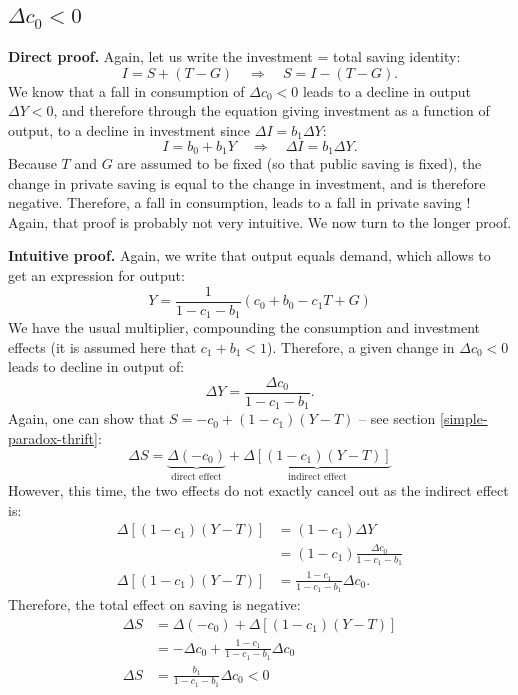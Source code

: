 \documentclass[]{book}
\theoremstyle{definition}
\theoremstyle{definition}
\theoremstyle{definition}
\theoremstyle{remark}
\begin{document}
\subsection{\texorpdfstring{\(\Delta c_{0}<0\)}{\textbackslash{}Delta c\_\{0\}\textless{}0}}\label{delta-c_00-1}

\textbf{Direct proof.} Again, let us write the investment = total saving
identity:
\[I=S+\left(T-G\right)\quad\Rightarrow\quad S=I-\left(T-G\right).\] We
know that a fall in consumption of \(\Delta c_{0}<0\) leads to a decline
in output \(\Delta Y<0\), and therefore through the equation giving
investment as a function of output, to a decline in investment since
\(\Delta I=b_{1}\Delta Y\):
\[I=b_{0}+b_{1}Y\quad\Rightarrow\quad\Delta I=b_{1}\Delta Y.\] Because
\(T\) and \(G\) are assumed to be fixed (so that public saving is
fixed), the change in private saving is equal to the change in
investment, and is therefore negative. Therefore, a fall in consumption,
leads to a fall in private saving ! Again, that proof is probably not
very intuitive. We now turn to the longer proof.

\textbf{Intuitive proof.} Again, we write that output equals demand,
which allows to get an expression for output:
\[Y=\frac{1}{1-c_{1}-b_{1}}\left(c_{0}+b_{0}-c_{1}T+G\right)\] We have
the usual multiplier, compounding the consumption and investment effects
(it is assumed here that \(c_{1}+b_{1}<1\)). Therefore, a given change
in \(\Delta c_{0}<0\) leads to decline in output of:
\[\Delta Y=\frac{\Delta c_{0}}{1-c_{1}-b_{1}}.\] Again, one can show
that \(S=-c_{0}+\left(1-c_{1}\right)\left(Y-T\right)\) -- see section
\ref{simple-paradox-thrift}:
\[\Delta S=\underbrace{\Delta(-c_{0})}_{\text{direct effect}}+\underbrace{\Delta\left[\left(1-c_{1}\right)\left(Y-T\right)\right]}_{\text{indirect effect}}\]
However, this time, the two effects do not exactly cancel out as the
indirect effect is: \[
\begin{aligned}
\Delta\left[\left(1-c_{1}\right)\left(Y-T\right)\right] &=(1-c_{1})\Delta Y\\
    &=(1-c_{1})\frac{\Delta c_{0}}{1-c_{1}-b_{1}}\\
\Delta\left[\left(1-c_{1}\right)\left(Y-T\right)\right] &=\frac{1-c_{1}}{1-c_{1}-b_{1}}\Delta c_{0}.
\end{aligned}
\] Therefore, the total effect on saving is negative: \[
\begin{aligned}
\Delta S    &=\Delta(-c_{0})+\Delta\left[\left(1-c_{1}\right)\left(Y-T\right)\right]\\
    &=-\Delta c_{0}+\frac{1-c_{1}}{1-c_{1}-b_{1}}\Delta c_{0}\\
\Delta S    &=\frac{b_{1}}{1-c_{1}-b_{1}}\Delta c_{0} <0
\end{aligned}
\]
\end{document}
